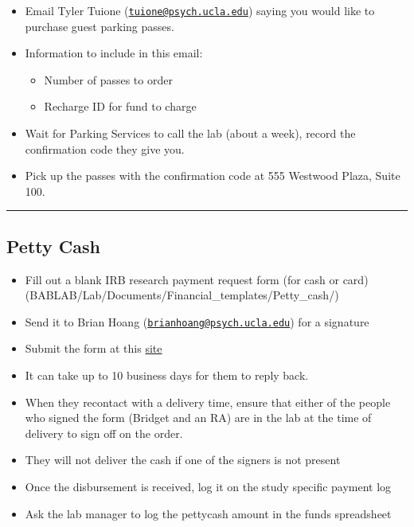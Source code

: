 \documentclass[
]{book}
\providecommand{\tightlist}{%
  \setlength{\itemsep}{0pt}\setlength{\parskip}{0pt}}
\begin{document}
\begin{itemize}
\tightlist
\item
  Email Tyler Tuione (\href{mailto:tuione@psych.ucla.edu}{\nolinkurl{tuione@psych.ucla.edu}}) saying you would like to purchase guest parking passes.
\item
  Information to include in this email:

  \begin{itemize}
  \tightlist
  \item
    Number of passes to order
  \item
    Recharge ID for fund to charge
  \end{itemize}
\item
  Wait for Parking Services to call the lab (about a week), record the confirmation code they give you.
\item
  Pick up the passes with the confirmation code at 555 Westwood Plaza, Suite 100.
\end{itemize}

\begin{center}\rule{0.5\linewidth}{0.5pt}\end{center}

\hypertarget{petty-cash}{%
\subsection{Petty Cash}\label{petty-cash}}

\begin{itemize}
\tightlist
\item
  Fill out a blank IRB research payment request form (for cash or card)(BABLAB/Lab/Documents/Financial\_templates/Petty\_cash/)
\item
  Send it to Brian Hoang (\href{mailto:brianhoang@psych.ucla.edu}{\nolinkurl{brianhoang@psych.ucla.edu}}) for a signature
\item
  Submit the form at this \href{https://sa.ucla.edu/MessageCenter/OneStop/Home/PostMessage?topicId=293}{site}
\item
  It can take up to 10 business days for them to reply back.
\item
  When they recontact with a delivery time, ensure that either of the people who signed the form (Bridget and an RA) are in the lab at the time of delivery to sign off on the order.
\item
  They will not deliver the cash if one of the signers is not present
\item
  Once the disbursement is received, log it on the study specific payment log
\item
  Ask the lab manager to log the pettycash amount in the funds spreadsheet
\end{itemize}
\end{document}
